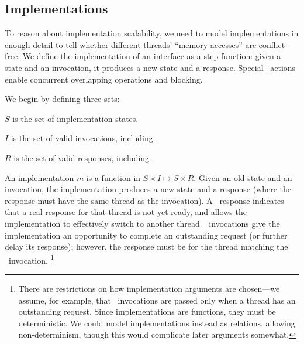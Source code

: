 

\subsection{Implementations}
\label{sec:rule:implementations}

To reason about implementation scalability, we need to model
implementations in enough detail to tell
whether different threads' ``memory accesses'' are conflict-free.
%
We define the implementation of an interface as a step
function: given a state and an invocation, it produces a new state and a
response. Special \CONTINUE\ actions enable
concurrent overlapping operations and blocking.

We begin by defining three sets:

\begin{CompactItemize}
\item $S$ is the set of implementation states.
\item $I$ is the set of valid invocations, including \CONTINUE.
\item $R$ is the set of valid responses, including \CONTINUE.
\end{CompactItemize}

An implementation $m$ is a function in $S \times I \mapsto S \times R$.
Given an old state and an invocation, the
implementation produces a new state and a response (where the response
must have the same thread as the invocation).
A \CONTINUE\ response indicates that a real response for that thread is
not yet ready,
and allows the implementation to effectively switch to another thread.
\CONTINUE\ invocations give the implementation an opportunity to complete an
outstanding request (or further delay its response); however, the response
must be for the thread matching the \CONTINUE\ invocation.%
\footnote{There are restrictions on how implementation
  arguments are chosen---we assume, for example, that \CONTINUE\ invocations
  are passed only when a thread has an outstanding request.
  Since implementations are functions, they must be
  deterministic. We could model implementations instead as relations,
  allowing non-determinism, though this would complicate later arguments
  somewhat.}
%

